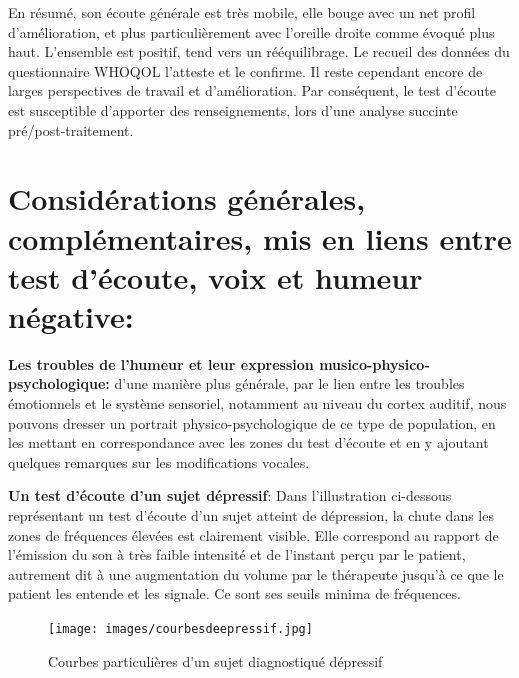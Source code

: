                 En résumé, son écoute générale est très mobile, elle bouge avec un
                net profil d'amélioration, et plus particulièrement avec l'oreille
                droite comme évoqué plus haut. L'ensemble est positif, tend vers un
                rééquilibrage. Le recueil des données du
                questionnaire WHOQOL l'atteste et le confirme.
                Il reste cependant encore de larges perspectives de travail et d'amélioration.
                Par conséquent, le test d'écoute est susceptible d'apporter des renseignements, lors
                    d'une analyse succinte pré/post-traitement.






                    \section{Considérations générales, complémentaires, mis en liens entre test d'écoute, voix et humeur négative:}


                  \textbf{Les troubles de l'humeur et leur expression
                  musico-phy\-sico-psy\-cho\-lo\-gi\-que:}
                  d'une manière plus générale, par le lien entre les troubles
                  émotionnels et le
                  système sensoriel, notamment au niveau du cortex auditif, nous
                  pouvons dresser un portrait
                  physico-psychologique de ce type de population,
                  en les mettant en correspondance avec les zones du test d'écoute et
                  en y ajoutant quelques remarques sur les modifications vocales.

                  \textbf{Un test d'écoute d'un sujet dépressif}:
                  Dans l'illustration ci-dessous représentant un test
                  d'écoute d'un sujet atteint de dépression, la
                  chute dans les zones de fréquences élevées est
                  clairement visible. Elle correspond au rapport de l'émission du son à
                  très faible intensité et de
                  l'instant perçu par le
                  patient, autrement dit à une augmentation
                  du volume
                  par le thérapeute jusqu'à ce que le patient les entende et les signale.
                  Ce sont ses seuils minima de fréquences.
                  \begin{figure}[ht]
                  \centering
                  \texttt{[image: images/courbesdeepressif.jpg]}
                  \caption{Courbes particulières d'un sujet diagnostiqué dépressif}
                  \label{fig:courbes du dépressif}
                    \end{figure}


